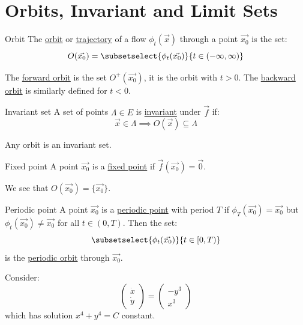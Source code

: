 \documentclass[../Main.tex]{subfiles}
\begin{document}
\section{Orbits, Invariant and Limit Sets}
\begin{definition}{Orbit}
    The \underline{orbit} or \underline{trajectory} of a flow $\phi_t(\vec{x})$ through a point $\vec{x_0}$ is the set:
    \begin{equation*}
        O(\vec{x_0}) = \subsetselect{\phi_t(\vec{x_0})}{t \in (-\infty, \infty)}
    \end{equation*}
\end{definition}
The \underline{forward orbit} is the set $O^+(\vec{x_0})$, it is the orbit with $t > 0$. The \underline{backward orbit} is similarly defined for $t < 0$.
\begin{definition}{Invariant set}
    A set of points $\Lambda \in E$ is \underline{invariant} under $\vec{f}$ if:
    \begin{equation*}
        \vec{x} \in \Lambda \implies O(\vec{x}) \subseteq \Lambda
    \end{equation*}
\end{definition}
\begin{remark}
    Any orbit is an invariant set.
\end{remark}
\begin{definition}{Fixed point}
    A point $\vec{x_0}$ is a \underline{fixed point} if $\vec{f}(\vec{x_0}) = \vec{0}$.
\end{definition}
We see that $O(\vec{x_0}) = \{\vec{x_0}\}$.
\begin{definition}{Periodic point}
    A point $\vec{x_0}$ is a \underline{periodic point} with period $T$ if $\phi_T(\vec{x_0}) = \vec{x_0}$ but $\phi_t(\vec{x_0}) \neq \vec{x_0}$ for all $t \in (0, T)$. Then the set:
    \begin{equation*}
        \subsetselect{\phi_t(\vec{x_0})}{t \in [0, T)}
    \end{equation*}
    is the \underline{periodic orbit} through $\vec{x_0}$.
\end{definition}
\begin{example}
    Consider:
    \begin{equation*}
        \begin{pmatrix}\dot{x} \\ \dot{y}\end{pmatrix} = \begin{pmatrix}-y^3 \\ x^3\end{pmatrix}
    \end{equation*}
    which has solution $x^4 + y^4 = C$ constant.
    \label{exPeriodicCycle}
\end{example}
\end{document}
